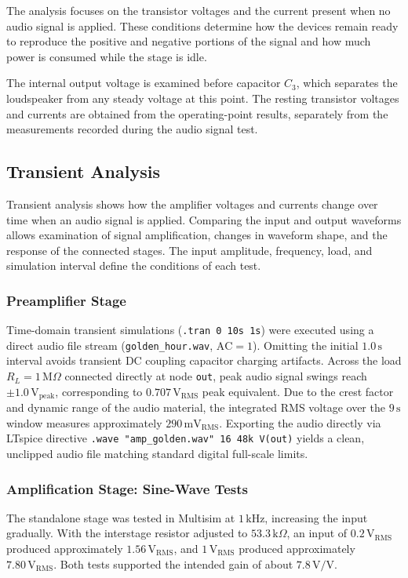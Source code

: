 \documentclass[conference]{IEEEtran}
\begin{document}
The analysis focuses on the transistor voltages and the current present when no audio signal is applied. These conditions determine how the devices remain ready to reproduce the positive and negative portions of the signal and how much power is consumed while the stage is idle.

The internal output voltage is examined before capacitor $C_3$, which separates the loudspeaker from any steady voltage at this point. The resting transistor voltages and currents are obtained from the operating-point results, separately from the measurements recorded during the audio signal test.

\subsection{Transient Analysis}
Transient analysis shows how the amplifier voltages and currents change over time when an audio signal is applied. Comparing the input and output waveforms allows examination of signal amplification, changes in waveform shape, and the response of the connected stages. The input amplitude, frequency, load, and simulation interval define the conditions of each test.

\subsubsection{Preamplifier Stage}
Time-domain transient simulations (\texttt{.tran 0 10s 1s}) were executed using a direct audio file stream (\texttt{golden\_hour.wav}, $\text{AC} = 1$). Omitting the initial $1.0\,\mathrm{s}$ interval avoids transient DC coupling capacitor charging artifacts. Across the load $R_L = 1\,\mathrm{M}\Omega$ connected directly at node \texttt{out}, peak audio signal swings reach $\pm1.0\,\mathrm{V_{peak}}$, corresponding to $0.707\,\mathrm{V_{RMS}}$ peak equivalent. Due to the crest factor and dynamic range of the audio material, the integrated RMS voltage over the $9\,\mathrm{s}$ window measures approximately $290\,\mathrm{mV_{RMS}}$. Exporting the audio directly via LTspice directive \texttt{.wave "amp\_golden.wav" 16 48k V(out)} yields a clean, unclipped audio file matching standard digital full-scale limits.

\subsubsection{Amplification Stage: Sine-Wave Tests}
The standalone stage was tested in Multisim at $1\,\mathrm{kHz}$, increasing the input gradually. With the interstage resistor adjusted to $53.3\,\mathrm{k}\Omega$, an input of $0.2\,\mathrm{V_{RMS}}$ produced approximately $1.56\,\mathrm{V_{RMS}}$, and $1\,\mathrm{V_{RMS}}$ produced approximately $7.80\,\mathrm{V_{RMS}}$. Both tests supported the intended gain of about $7.8\,\mathrm{V/V}$.
\end{document}
